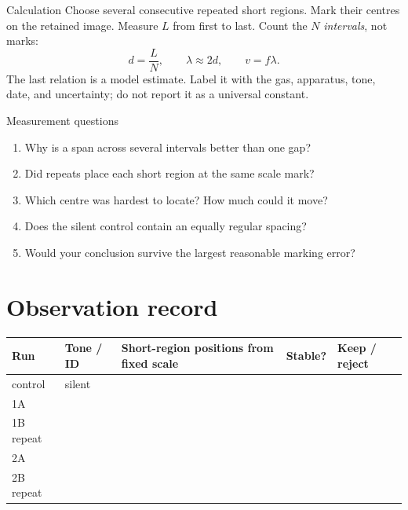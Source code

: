 \noindent
\begin{minipage}[t]{0.48\linewidth}
\begin{teloscard}{Calculation}
Choose several consecutive repeated short regions. Mark their centres on the
retained image. Measure \(L\) from first to last. Count the \(N\)
\emph{intervals}, not marks:
\[
  d=\frac{L}{N},\qquad \lambda\approx2d,\qquad v=f\lambda .
\]
The last relation is a model estimate. Label it with the gas, apparatus, tone,
date, and uncertainty; do not report it as a universal constant.
\end{teloscard}
\end{minipage}\hfill
\begin{minipage}[t]{0.49\linewidth}
\begin{teloscard}{Measurement questions}
\begin{enumerate}
\item Why is a span across several intervals better than one gap?
\item Did repeats place each short region at the same scale mark?
\item Which centre was hardest to locate? How much could it move?
\item Does the silent control contain an equally regular spacing?
\item Would your conclusion survive the largest reasonable marking error?
\end{enumerate}
\end{teloscard}
\end{minipage}
\normalsize

\newpage
{}

\section{Observation record}
\renewcommand{\arraystretch}{1.45}
\begin{tabularx}{\linewidth}{|p{.095\linewidth}|p{.13\linewidth}|X|p{.14\linewidth}|p{.12\linewidth}|}
\hline
\textbf{Run} & \textbf{Tone / ID} & \textbf{Short-region positions from fixed scale} & \textbf{Stable?} & \textbf{Keep / reject}\\ \hline
control & silent & & & \\ \hline
1A & & & & \\ \hline
1B repeat & & & & \\ \hline
2A & & & & \\ \hline
2B repeat & & & & \\ \hline
\end{tabularx}

